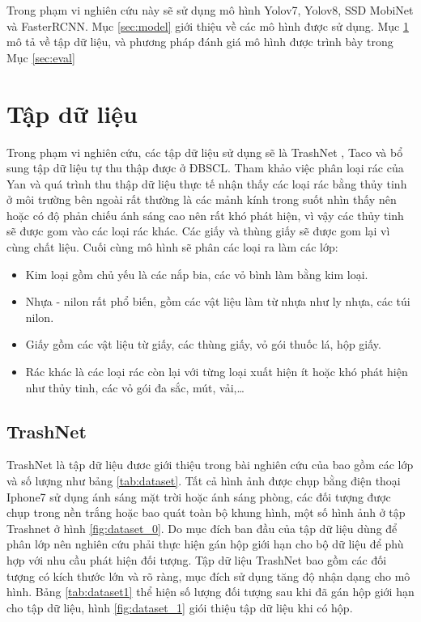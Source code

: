 \documentclass[../the.tex]{subfiles}
\begin{document}
Trong phạm vi nghiên cứu này sẽ sử dụng mô hình Yolov7, Yolov8, SSD MobiNet và FasterRCNN. Mục \ref{sec:model} giới thiệu về các mô hình được sử dụng. Mục \ref{sec:dataset} mô tả về tập dữ liệu, và phương pháp đánh giá mô hình được trình bày trong Mục \ref{sec:eval}

\section{Tập dữ liệu}
\label{sec:dataset}

{\fontsize{13}{12} \selectfont
	Trong phạm vi nghiên cứu, các tập dữ liệu sử dụng sẽ là TrashNet \cite{yang2016classification}, Taco \cite{proença2020taco} và bổ sung tập dữ liệu tự thu thập được ở ĐBSCL.
	Tham khảo việc phân loại rác của Yan \cite{yang2016classification} và quá trình thu thập dữ liệu thực tế nhận thấy các loại rác bằng thủy tinh ở môi trường bên ngoài rất thường là các mảnh kính trong suốt nhìn thấy nên hoặc có độ phản chiếu ánh sáng cao nên rất khó phát hiện, vì vậy các thủy tinh sẽ được gom vào các loại rác khác.
	Các giấy và thùng giấy sẽ được gom lại vì cùng chất liệu. Cuối cùng mô hình sẽ phân các loại ra làm các lớp:
	\begin{itemize}
		\item Kim loại gồm chủ yếu là các nắp bia, các vỏ bình làm bằng kim loại.
		\item Nhựa - nilon rất phổ biến, gồm các vật liệu làm từ nhựa như ly nhựa, các túi nilon.
		\item Giấy gồm các vật liệu từ giấy, các thùng giấy, vỏ gói thuốc lá, hộp giấy.
		\item Rác khác là các loại rác còn lại với từng loại xuất hiện ít hoặc khó phát hiện như thủy tinh, các vỏ gói đa sắc,
		      mút, vải,\dots
	\end{itemize}

	\subsection{TrashNet}
	{\fontsize{13}{12} \selectfont
		TrashNet là tập dữ liệu đươc giới thiệu trong bài nghiên cứu của \cite{yang2016classification} bao gồm các lớp và số lượng như bảng \ref{tab:dataset}. Tất cả hình ảnh được chụp bằng điện thoại Iphone7 sử dụng ánh sáng mặt trời hoặc ánh sáng phòng, các đối tượng được chụp trong nền trắng hoặc bao quát toàn bộ khung hình, một số hình ảnh ở tập Trashnet ở hình
		\ref{fig:dataset_0}.
		Do mục đích ban đầu của tập dữ liệu dùng để phân lớp nên nghiên cứu phải thực hiện gán hộp giới hạn cho bộ dữ liệu để phù hợp với nhu cầu phát hiện đối tượng. Tập dữ liệu TrashNet bao gồm các đối tượng có kích thước lớn và rõ ràng, mục đích sử dụng tăng độ nhận dạng cho mô hình. Bảng \ref{tab:dataset1} thể hiện số lượng đối tượng sau khi đã gán hộp giới hạn cho tập dữ liệu, hình
		\ref{fig:dataset_1} giói thiệu tập dữ liệu khi có hộp.
	}
}
\end{document}
